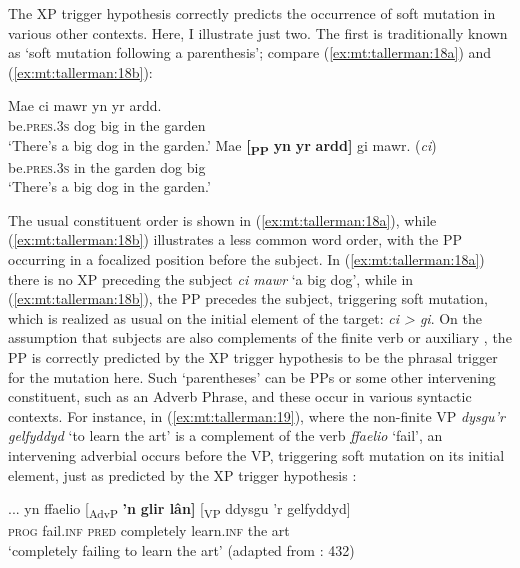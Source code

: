 \documentclass[output=paper,colorlinks,citecolor=brown]{langscibook}
\begin{document}
The XP trigger hypothesis correctly predicts the occurrence of soft mutation in various other contexts. Here, I illustrate just two. The first is traditionally known as ‘soft mutation following a parenthesis’; compare (\ref{ex:mt:tallerman:18a}) and (\ref{ex:mt:tallerman:18b}): 

\ea
\ea \label{ex:mt:tallerman:18a}
\gll Mae ci mawr yn yr ardd.\\
be.\textsc{pres.3s} dog big in the garden \\
\glt ‘There’s a big dog in the garden.’
\ex \label{ex:mt:tallerman:18b}
\gll Mae \textbf{[\textsubscript{PP}} \textbf{yn} \textbf{yr} \textbf{ardd]} gi mawr. (\textit{ci}) \\
be.\textsc{pres.3s} {} in the garden dog big \\
\glt ‘There’s a big dog in the garden.’
\z
\z

The usual constituent order is shown in (\ref{ex:mt:tallerman:18a}), while (\ref{ex:mt:tallerman:18b}) illustrates a less common word order, with the PP occurring in a focalized position before the subject. In (\ref{ex:mt:tallerman:18a}) there is no XP preceding the subject {\textit{ci mawr}}{ ‘a big dog’, while in (\ref{ex:mt:tallerman:18b}), the PP precedes the subject, triggering soft mutation, which is realized as usual on the initial element of the target:} {\textit{ci > gi}}{. On the assumption that subjects are also complements of the finite verb or auxiliary \citep{Borsley1999}, the PP is correctly predicted by the XP trigger hypothesis to be the phrasal trigger for the mutation here. Such ‘parentheses’ can be PPs or some other intervening constituent, such as an Adverb Phrase, and these occur in various syntactic contexts. For instance, in (\ref{ex:mt:tallerman:19}), where the non-finite VP} {\textit{dysgu’r gelfyddyd} }{‘to learn the art’ is a complement of the verb} {\textit{ffaelio}}{ ‘fail’, an intervening adverbial occurs before the VP, triggering soft mutation on its initial element, just as predicted by the XP trigger hypothesis \citep{Tallerman2006}:} 

\ea\label{ex:mt:tallerman:19}
\gll  ... yn ffaelio [\textsubscript{AdvP} \textbf{’n} \textbf{glir lân]} [\textsubscript{VP} ddysgu ’r gelfyddyd] \\
{} \textsc{prog} fail.\textsc{inf} {} \textsc{pred} completely {} learn.\textsc{inf} the art\\
\glt ‘completely failing to learn the art’ (adapted from \citealt{Morgan1952}: 432) 
\z

\end{document}
